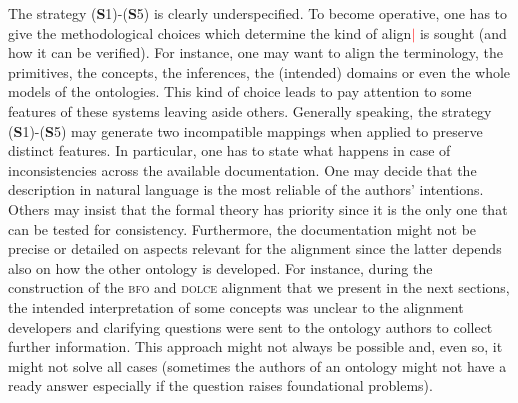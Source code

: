 \documentclass[ao]{iosart2x}
\newcommand{\nb}[1]{\textcolor{red}{$|$}\marginpar{\hspace*{-0cm}\parbox{20mm}{\scriptsize\raggedright\textcolor{red}{#1}}}}
\newcommand{\dolce}{{\textsc{dolce}}}
\newcommand{\bfo}{{\textsc{bfo}}}
\begin{document}
The strategy ({\bf S}1)-({\bf S}5) is clearly underspecified. To become operative, one has to give the methodological choices which determine the kind of align\nb{CM: alignment?} is sought (and how it can be verified). For instance, one may want to align the terminology, the primitives, the concepts, the inferences, the (intended) domains or even the whole models of the ontologies. This kind of choice leads to pay attention to some features of these systems leaving aside others. Generally speaking, the strategy ({\bf S}1)-({\bf S}5) may generate two incompatible mappings when applied to preserve distinct features.
In particular, one has to state what happens in case of inconsistencies across the available documentation. One may decide that the description in natural language is the most reliable of the authors' intentions. Others may insist that the formal theory has priority since it is the only one that can be tested for consistency. Furthermore, the documentation might not be precise or detailed on aspects relevant for the alignment since the latter depends also on how the other ontology is developed. For instance, during the construction of the {\bfo} and {\dolce} alignment that we present in the next sections, the intended interpretation of some concepts was unclear to the alignment developers and clarifying questions were sent to the ontology authors to collect further information. This approach might not always be possible and, even so, it might not solve all cases (sometimes the authors of an ontology might not have a ready answer especially if the question raises foundational problems). %
\end{document}
